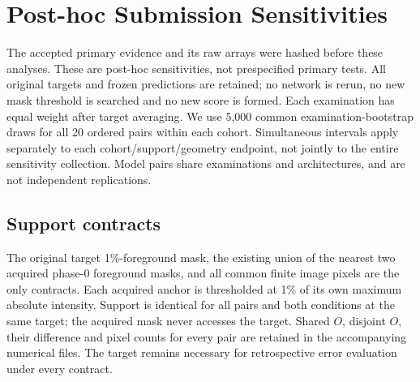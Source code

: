 \section{Post-hoc Submission Sensitivities}
\label{sec:submission-sensitivity}
The accepted primary evidence and its raw arrays were hashed before these analyses. These are post-hoc sensitivities, not prespecified primary tests. All original targets and frozen predictions are retained; no network is rerun, no new mask threshold is searched and no new score is formed. Each examination has equal weight after target averaging. We use 5,000 common examination-bootstrap draws for all 20 ordered pairs within each cohort. Simultaneous intervals apply separately to each cohort/support/geometry endpoint, not jointly to the entire sensitivity collection. Model pairs share examinations and architectures, and are not independent replications.

\subsection{Support contracts}
The original target 1\%-foreground mask, the existing union of the nearest two acquired phase-0 foreground masks, and all common finite image pixels are the only contracts. Each acquired anchor is thresholded at 1\% of its own maximum absolute intensity. Support is identical for all pairs and both conditions at the same target; the acquired mask never accesses the target. Shared $O$, disjoint $O$, their difference and pixel counts for every pair are retained in the accompanying numerical files. The target remains necessary for retrospective error evaluation under every contract.

